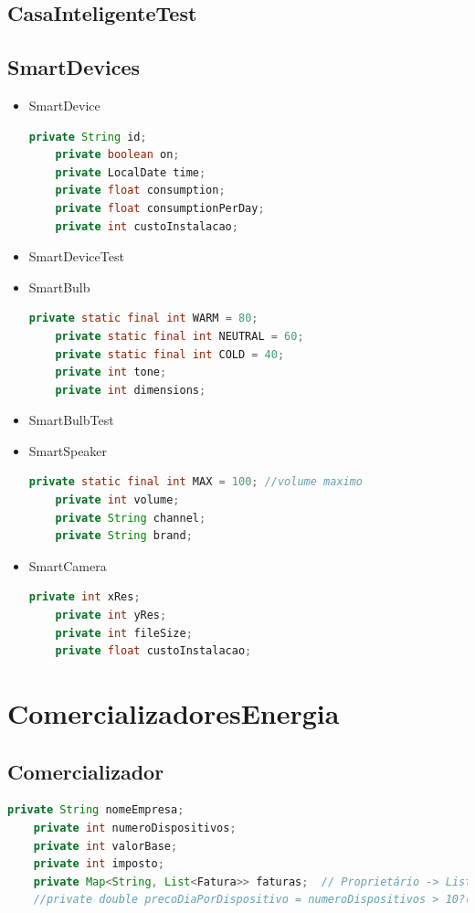 \documentclass[11pt,a4paper]{report}
\begin{document}
	\subsection{CasaInteligenteTest}
	\subsection{SmartDevices}
        \begin{itemize}
        \item SmartDevice
        \begin{lstlisting}[language=java,firstnumber=1]
    private String id;
    private boolean on;
    private LocalDate time;
    private float consumption;
    private float consumptionPerDay;
    private int custoInstalacao;
    \end{lstlisting}
    
        \item SmartDeviceTest
        \item SmartBulb
        \begin{lstlisting}[language=java,firstnumber=1]
    private static final int WARM = 80;
    private static final int NEUTRAL = 60;
    private static final int COLD = 40;
    private int tone;
    private int dimensions;
    \end{lstlisting}
    
        \item SmartBulbTest
        \item SmartSpeaker
        \begin{lstlisting}[language=java,firstnumber=1]
    private static final int MAX = 100; //volume maximo
    private int volume;
    private String channel;
    private String brand;
    \end{lstlisting}
    
        \item SmartCamera
        \begin{lstlisting}[language=java,firstnumber=1]
    private int xRes;
    private int yRes;
    private int fileSize;
    private float custoInstalacao;
    \end{lstlisting}
    
        \end{itemize}
        
	\section{ComercializadoresEnergia}
	
	\subsection{Comercializador}
	\begin{lstlisting}[language=java,firstnumber=1]
    private String nomeEmpresa;
    private int numeroDispositivos;
    private int valorBase;
    private int imposto;
    private Map<String, List<Fatura>> faturas;  // Proprietário -> Lista de Faturas
    //private double precoDiaPorDispositivo = numeroDispositivos > 10?(valorBase * consumoDispositivo * (1 + imposto)) * 0.9 : (valorBase * consumoDispositivo * (1 + imposto)) * 0.75;
    \end{lstlisting}
	
\end{document}
